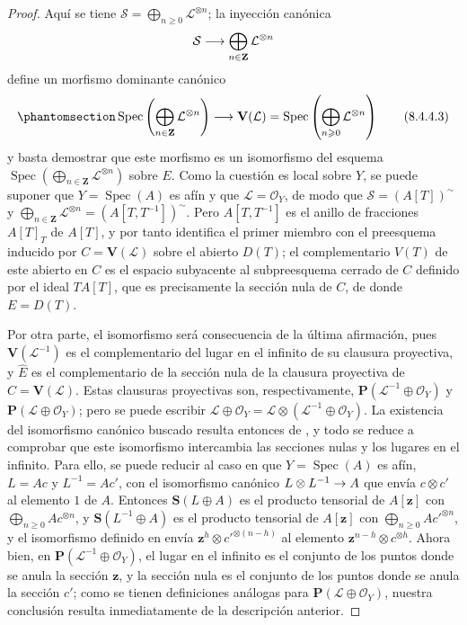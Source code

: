 \documentclass[oneside,10pt]{amsart}
\makeatletter
\renewcommand{\geq}{\geqslant}
\newcommand{\ega@arrow}[2]{\mathchoice{#1}{#2}{#2}{#2}}
\renewcommand{\to}{\ega@arrow{\longrightarrow}{\rightarrow}}
\newcommand{\oldpage}[2][]{\marginnote{\normalfont\footnotesize\textbf{#1}~|~#2}\ignorespaces}
\let\EGAOriginalLabel\label
\renewcommand{\label}[1]{\phantomsection\EGAOriginalLabel{#1}}
\newcommand*{\ega@labelnumber}[1]{\StrBehind{#1}{.}}
\newcommand{\eref}[1]{\hyperref[#1]{\normalfont{(\ega@labelnumber{#1})}}}
\makeatother
\begin{document}
\begin{proof}
Aquí se tiene $\mathcal{S}=\bigoplus_{n\geq0}\mathcal{L}^{\otimes n}$;
la inyección canónica
\[
  \mathcal{S}\to\bigoplus_{n\in\mathbf{Z}}\mathcal{L}^{\otimes n}
\]
define un morfismo dominante canónico
\begin{equation}
\label{II.8.4.4.3-fr}
  \operatorname{Spec}\left(
    \bigoplus_{n\in\mathbf{Z}}\mathcal{L}^{\otimes n}
  \right)
  \to\mathbf{V}(\mathcal{L})
  =\operatorname{Spec}\left(
    \bigoplus_{n\geq0}\mathcal{L}^{\otimes n}
  \right)
\tag{8.4.4.3}
\end{equation}
y basta demostrar que este morfismo es un isomorfismo del esquema $\operatorname{Spec}(\bigoplus_{n\in\mathbf{Z}}\mathcal{L}^{\otimes n})$ sobre $E$.
Como la cuestión es local sobre $Y$, se puede suponer que $Y=\operatorname{Spec}(A)$ es afín
\oldpage[II]{169}
y que $\mathcal{L}=\mathcal{O}_Y$, de modo que $\mathcal{S}=(A[T])^{\sim}$ y $\bigoplus_{n\in\mathbf{Z}}\mathcal{L}^{\otimes n}
=(A[T,T^{-1}])^{\sim}$.
Pero $A[T,T^{-1}]$ es el anillo de fracciones $A[T]_T$ de $A[T]$, y por tanto \eref{II.8.4.4.3-fr} identifica el primer miembro con el preesquema inducido por $C=\mathbf{V}(\mathcal{L})$ sobre el abierto $D(T)$;
el complementario $V(T)$ de este abierto en $C$ es el espacio subyacente al subpreesquema cerrado de $C$ definido por el ideal $TA[T]$, que es precisamente la sección nula de $C$, de donde $E=D(T)$.

Por otra parte, el isomorfismo \eref{II.8.4.4.2-fr} será consecuencia de la última afirmación, pues $\mathbf{V}(\mathcal{L}^{-1})$ es el complementario del lugar en el infinito de su clausura proyectiva, y $\widehat{E}$ es el complementario de la sección nula de la clausura proyectiva de $C=\mathbf{V}(\mathcal{L})$.
Estas clausuras proyectivas son, respectivamente, $\mathbf{P}(\mathcal{L}^{-1}\oplus\mathcal{O}_Y)$ y $\mathbf{P}(\mathcal{L}\oplus\mathcal{O}_Y)$;
pero se puede escribir $\mathcal{L}\oplus\mathcal{O}_Y
=\mathcal{L}\otimes(\mathcal{L}^{-1}\oplus\mathcal{O}_Y)$.
La existencia del isomorfismo canónico buscado resulta entonces de , y todo se reduce a comprobar que este isomorfismo intercambia las secciones nulas y los lugares en el infinito.
Para ello, se puede reducir al caso en que $Y=\operatorname{Spec}(A)$ es afín, $L=Ac$ y $L^{-1}=Ac'$, con el isomorfismo canónico $L\otimes L^{-1}\to A$ que envía $c\otimes c'$ al elemento $1$ de $A$.
Entonces $\mathbf{S}(L\oplus A)$ es el producto tensorial de $A[\mathbf{z}]$ con $\bigoplus_{n\geq0}Ac^{\otimes n}$, y $\mathbf{S}(L^{-1}\oplus A)$ es el producto tensorial de $A[\mathbf{z}]$ con $\bigoplus_{n\geq0}Ac'^{\otimes n}$, y el isomorfismo definido en  envía $\mathbf{z}^h\otimes c'^{\otimes(n-h)}$ al elemento $\mathbf{z}^{n-h}\otimes c^{\otimes h}$.
Ahora bien, en $\mathbf{P}(\mathcal{L}^{-1}\oplus\mathcal{O}_Y)$, el lugar en el infinito es el conjunto de los puntos donde se anula la sección $\mathbf{z}$, y la sección nula es el conjunto de los puntos donde se anula la sección $c'$;
como se tienen definiciones análogas para $\mathbf{P}(\mathcal{L}\oplus\mathcal{O}_Y)$, nuestra conclusión resulta inmediatamente de la descripción anterior.
\end{proof}
\end{document}
